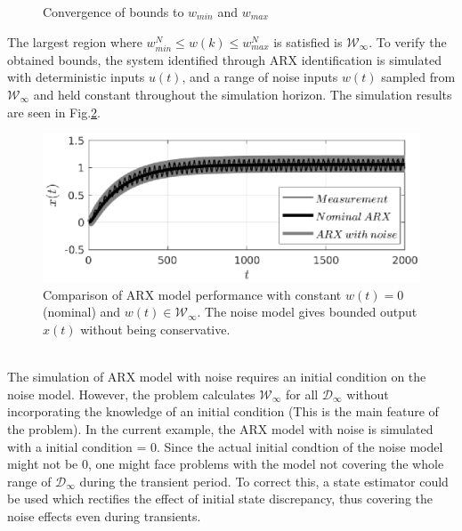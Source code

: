 \documentclass[letterpaper, 10 pt, conference]{ieeeconf}  %
\begin{document}
\begin{enumerate}
\begin{figure}[h]
		\caption{Convergence of bounds to $w_{min}$ and $w_{max}$}
		\label{bounds}
	\end{figure} 
	The largest region where $w^N_{min} \leq w(k) \leq w^N_{max}$ is satisfied is $\mathcal{W}_{\infty}$. To verify the obtained bounds, the system identified through ARX identification is simulated with deterministic inputs $u(t)$, and a range of noise inputs $w(t)$ sampled from $\mathcal{W}_{\infty}$ and held constant throughout the simulation horizon. The simulation results are seen in Fig.\ref{simulation}.
	\begin{figure}[h]
		\includegraphics[scale = 0.65]{simulation.eps}
		\caption{Comparison of ARX model performance with constant $w(t)=0$(nominal) and $w(t)\in \mathcal{W}_{\infty}$. The noise model gives bounded output $x(t)$ without being conservative.}
		\label{simulation}
	\end{figure} \\
	The simulation of ARX model with noise requires an initial condition on the noise model. However, the problem calculates $\mathcal{W}_{\infty}$ for all $\mathcal{D}_{\infty}$ without incorporating the knowledge of an initial condition (This is the main feature of the problem). In the current example, the ARX model with noise is simulated with a initial condition = $0$. Since the actual initial condtion of the noise model might not be $0$, one might face problems with the model not covering the whole range of $\mathcal{D}_{\infty}$ during the transient period. To correct this, a state estimator could be used which rectifies the effect of initial state discrepancy, thus covering the noise effects even during transients.

\end{enumerate}
\end{document}
